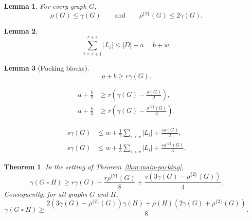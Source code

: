 \documentclass[10pt,a4paper]{amsart}
\newtheorem{theorem}{Theorem}
\newtheorem{lemma}{Lemma}
\newcommand{\rhoTwo}{\rho^{\{2\}}}
\begin{document}
\begin{lemma}\label{lem:packing-upper}
For every graph $G$,
\[
 \rho(G)\leq\gamma(G)
 \qquad\text{and}\qquad
 \rhoTwo(G)\leq2\gamma(G).
\]
\end{lemma}

\begin{lemma}\label{lem:sum-L}
\[
 \sum_{i=r+1}^{r+s}|L_i|\leq |D|-a=b+w.
\]
\end{lemma}

\begin{lemma}[Packing blocks]\label{lem:packing-blocks}
\[
 a+b\geq r\gamma(G).
\]
\end{lemma}

\begin{align}
 a+\frac b2&\geq r\left(\gamma(G)-\frac{\rho(G)}2\right),
 \label{eq:second-rho}\\
 a+\frac b3&\geq r\left(\gamma(G)-\frac{\rhoTwo(G)}3\right).
 \label{eq:second-rho2}
\end{align}

\begin{align}
 s\gamma(G)&\leq w+\frac12\sum_{i>r}|L_i|+\frac{s\rho(G)}2,
 \label{eq:leftover-rho}\\
 s\gamma(G)&\leq w+\frac13\sum_{i>r}|L_i|+\frac{s\rhoTwo(G)}3.
 \label{eq:leftover-rho2}
\end{align}

\begin{theorem}\label{thm:packing-function}
In the setting of Theorem~\ref{thm:main-packing},
\begin{equation}
 \gamma(G\mathbin{\square}H)
 \geq r\gamma(G)-\frac{r\rhoTwo(G)}8
 +\frac{s(3\gamma(G)-\rhoTwo(G))}{4}.
 \label{eq:packing-function}
\end{equation}
Consequently, for all graphs $G$ and $H$,
\begin{equation}
 \gamma(G\mathbin{\square}H)
 \geq
 \frac{2(3\gamma(G)-\rhoTwo(G))\gamma(H)
 +\rho(H)(2\gamma(G)+\rhoTwo(G))}{8}.
 \label{eq:packing-function-global}
\end{equation}
\end{theorem}
\end{document}
